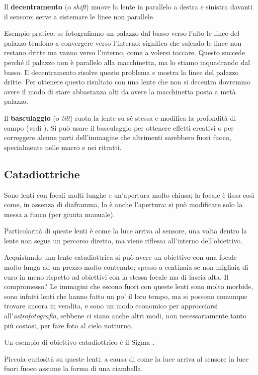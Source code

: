 Il \textbf{decentramento} (o \textit{shift}) muove la lente in parallelo a destra e sinistra davanti il sensore; serve a sistemare le linee non parallele.

Esempio pratico: se fotografiamo un palazzo dal basso verso l'alto le linee del palazzo tendono a convergere verso l'interno; significa che salendo le linee non restano dritte ma vanno verso l'interno, come a volersi toccare. Questo succede perché il palazzo non è parallelo alla macchinetta, ma lo stiamo inquadrando dal basso. Il decentramento risolve questo problema e mostra la linee del palazzo dritte.
Per ottenere questo risultato con una lente che non si decentra dovremmo avere il modo di stare abbastanza alti da avere la macchinetta posta a metà palazzo.

Il \textbf{basculaggio} (o \textit{tilt}) ruota la lente su sé stessa e modifica la profondità di campo (vedi ).
Si può usare il basculaggio per ottenere effetti creativi o per correggere alcune parti dell'immagine che altrimenti sarebbero fuori fuoco, specialmente nelle macro e nei ritratti.


\subsection{Catadiottriche} \label{subsec:lenticatadiottriche}
Sono lenti con focali molti lunghe e un'apertura molto chiusa; la focale è fissa così come, in assenza di diaframma, lo è anche l'apertura: si può modificare solo la messa a fuoco (per giunta manuale).

Particolarità di queste lenti è come la luce arriva al sensore, una volta dentro la lente non segue un percorso diretto, ma viene riflessa all'interno dell'obiettivo.

Acquistando una lente catadiottrica si può avere un obiettivo con una focale molto lunga ad un prezzo molto contenuto; spesso a centinaia se non migliaia di euro in meno rispetto ad obiettivi con la stessa focale ma di fascia alta.
Il compromesso? Le immagini che escono fuori con queste lenti sono molto morbide, sono infatti lenti che hanno fatto un po' il loro tempo, ma si possono comunque trovare ancora in vendita, e sono un modo economico per approcciarsi all'\textit{astrofotografia}, sebbene ci siano anche altri modi, non necessariamente tanto più costosi, per fare foto al cielo notturno.

Un esempio di obiettivo catadiottrico è il Sigma .

Piccola curiosità su queste lenti: a causa di come la luce arriva al sensore la luce fuori fuoco assume la forma di una ciambella.


